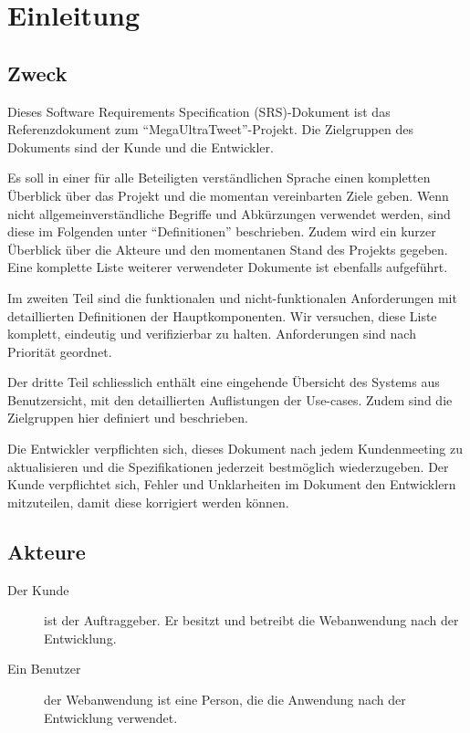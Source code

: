 \documentclass[a4wide]{article}
\title{}
\author{}
\begin{document}

\tableofcontents
\clearpage
\section{Einleitung}
\subsection{Zweck}
Dieses Software Requirements Specification (SRS)-Dokument ist das Referenzdokument zum \enquote{MegaUltraTweet}-Projekt. Die Zielgruppen des Dokuments sind der Kunde und die Entwickler.

Es soll in einer f\"ur alle Beteiligten verst\"andlichen Sprache einen kompletten \"Uberblick \"uber das Projekt und die momentan vereinbarten Ziele geben. Wenn nicht allgemeinverständliche Begriffe und Abk\"urzungen verwendet werden, sind diese im Folgenden unter \enquote{Definitionen} beschrieben. Zudem wird ein kurzer \"Uberblick \"uber die Akteure und den momentanen Stand des Projekts gegeben. Eine komplette Liste weiterer verwendeter Dokumente ist ebenfalls aufgef\"uhrt.

Im zweiten Teil sind die funktionalen und nicht-funktionalen Anforderungen mit detaillierten Definitionen der Hauptkomponenten. Wir versuchen, diese Liste komplett, eindeutig und verifizierbar zu halten. Anforderungen sind nach Priorit\"at geordnet.

Der dritte Teil schliesslich enth\"alt eine eingehende \"Ubersicht des Systems aus Benutzersicht, mit den detaillierten Auflistungen der Use-cases. Zudem sind die Zielgruppen hier definiert und beschrieben.

Die Entwickler verpflichten sich, dieses Dokument nach jedem Kundenmeeting zu aktualisieren und die Spezifikationen jederzeit bestm\"oglich wiederzugeben. Der Kunde verpflichtet sich, Fehler und Unklarheiten im Dokument den Entwicklern mitzuteilen, damit diese korrigiert werden k\"onnen.

\subsection{Akteure}
\begin{description}
\item[Der Kunde] ist der Auftraggeber. Er besitzt und betreibt die Webanwendung nach der Entwicklung.
\item[Ein Benutzer] der Webanwendung ist eine Person, die die Anwendung nach der Entwicklung verwendet.
\end{description}
\end{document}

